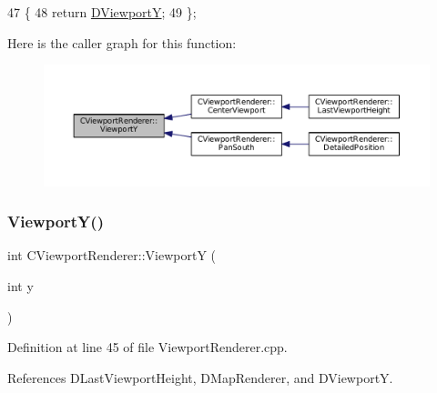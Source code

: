 \begin{DoxyCode}
47                              \{
48             \textcolor{keywordflow}{return} \hyperlink{classCViewportRenderer_ae13dd437a3da3d2bab16bc7ba61cb78f}{DViewportY};  
49         \};
\end{DoxyCode}
Here is the caller graph for this function\+:\nopagebreak
\begin{figure}[H]
\begin{center}
\leavevmode
\includegraphics[width=350pt]{classCViewportRenderer_add3d4da286927abe2f19fbb37fd42ed5_icgraph}
\end{center}
\end{figure}
\hypertarget{classCViewportRenderer_aebbe5e095b192de093376cde3cfc82dc}{}\label{classCViewportRenderer_aebbe5e095b192de093376cde3cfc82dc} 
\subsubsection{\texorpdfstring{Viewport\+Y()}{ViewportY()}\hspace{0.1cm}{\footnotesize\ttfamily [2/2]}}
{\footnotesize\ttfamily int C\+Viewport\+Renderer\+::\+ViewportY (\begin{DoxyParamCaption}\item[{int}]{y }\end{DoxyParamCaption})}



Definition at line 45 of file Viewport\+Renderer.\+cpp.



References D\+Last\+Viewport\+Height, D\+Map\+Renderer, and D\+ViewportY.


